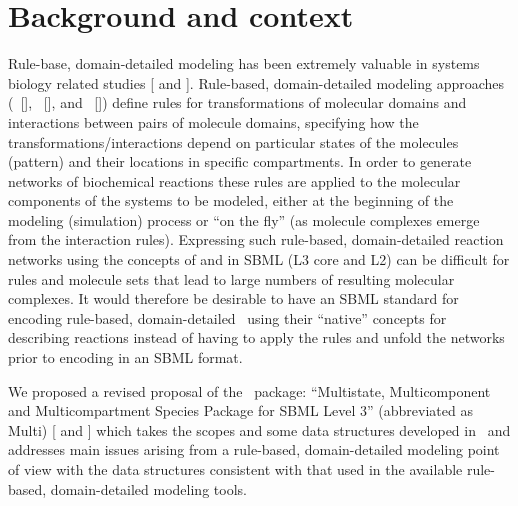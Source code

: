 
\section{Background and context}
\label{def:Background}

Rule-base, domain-detailed modeling has been extremely valuable in systems biology related studies [\cite{ref:nathan2015} and \cite{ref:jamesFader2013}]. Rule-based, domain-detailed modeling approaches (\BioNetGen\ [\cite{ref:bionetgen2009}], \Kappa\ [\cite{ref:kappa2004}], and \Simmune\ [\cite{ref:simmune2012, ref:simmune2006}]) define rules for \mBlockChangedBegin{\revTwentyTwentyMarch}transformations of molecular domains and \mBlockChangedEnd{\revTwentyTwentyMarch}interactions between pairs of molecule domains, specifying how the \mBlockChangedBegin{\revTwentyTwentyMarch}transformations/\mBlockChangedEnd{\revTwentyTwentyMarch}interactions depend on particular states of the molecules (pattern) and their locations in specific compartments. In order to generate networks of biochemical reactions these rules are applied to the molecular components of the systems to be modeled, either at the beginning of the modeling (simulation) process or ``on the fly'' (as molecule complexes emerge from the interaction rules). Expressing such rule-based, domain-detailed reaction networks using the concepts of \Species and \Compartment in SBML (L3 core and L2) can be difficult for rules and molecule sets that lead to large numbers of resulting molecular complexes. It would therefore be desirable to have an SBML standard for encoding rule-based, domain-detailed \smodels\ using their ``native'' concepts for describing reactions instead of having to apply the rules and unfold the networks prior to encoding in an SBML format.

We proposed a revised proposal of the \multi\ package: ``Multistate, Multicomponent and Multicompartment Species Package for SBML Level 3''  (abbreviated as Multi) [\cite{ref:revisedMulti} and \cite{ref:multiproposal280}] which takes the scopes and some data structures developed in \multiOneProposalWC\ and addresses main issues arising from a rule-based, domain-detailed modeling point of view with the data structures consistent with that used in the available rule-based, domain-detailed modeling tools. 

\label{def:OtherRuleBasedModels}


